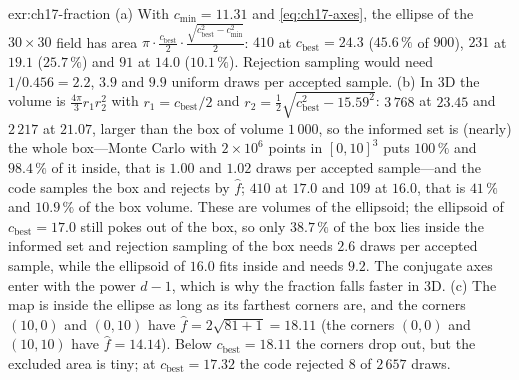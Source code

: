 \begin{solution}{exr:ch17-fraction}
(a) With $c_{\min}=11.31$ and \cref{eq:ch17-axes}, the ellipse of the $30\times30$ field has area $\pi\cdot\frac{c_{\mathrm{best}}}{2}\cdot\frac{\sqrt{c_{\mathrm{best}}^2-c_{\min}^2}}{2}$: $410$ at $c_{\mathrm{best}}=24.3$ ($45.6\,\%$ of $900$), $231$ at $19.1$ ($25.7\,\%$) and $91$ at $14.0$ ($10.1\,\%$). Rejection sampling would need $1/0.456=2.2$, $3.9$ and $9.9$ uniform draws per accepted sample. (b) In 3D the volume is $\frac{4\pi}{3}r_1r_2^2$ with $r_1=c_{\mathrm{best}}/2$ and $r_2=\frac12\sqrt{c_{\mathrm{best}}^2-15.59^2}$: $3\,768$ at $23.45$ and $2\,217$ at $21.07$, larger than the box of volume $1\,000$, so the informed set is (nearly) the whole box---Monte Carlo with $2\times10^6$ points in $[0,10]^3$ puts $100\,\%$ and $98.4\,\%$ of it inside, that is $1.00$ and $1.02$ draws per accepted sample---and the code samples the box and rejects by $\hat f$; $410$ at $17.0$ and $109$ at $16.0$, that is $41\,\%$ and $10.9\,\%$ of the box volume. These are volumes of the ellipsoid; the ellipsoid of $c_{\mathrm{best}}=17.0$ still pokes out of the box, so only $38.7\,\%$ of the box lies inside the informed set and rejection sampling of the box needs $2.6$ draws per accepted sample, while the ellipsoid of $16.0$ fits inside and needs $9.2$. The conjugate axes enter with the power $d-1$, which is why the fraction falls faster in 3D. (c) The map is inside the ellipse as long as its farthest corners are, and the corners $(10,0)$ and $(0,10)$ have $\hat f=2\sqrt{81+1}=18.11$ (the corners $(0,0)$ and $(10,10)$ have $\hat f=14.14$). Below $c_{\mathrm{best}}=18.11$ the corners drop out, but the excluded area is tiny; at $c_{\mathrm{best}}=17.32$ the code rejected $8$ of $2\,657$ draws.
\end{solution}
